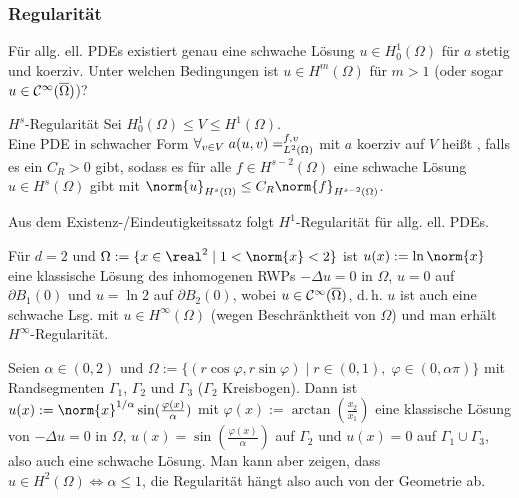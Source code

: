 \subsubsection{%
    Regularität%
}

\begin{Bem}
    Für allg. ell. PDEs existiert genau eine schwache Lösung $u \in H^1_0(\Omega)$ für
    $a$ stetig und koerziv.
    Unter welchen Bedingungen ist $u \in H^m(\Omega)$ für $m > 1$
    (oder sogar $u \in \mathcal{C}^\infty(\overline{\Omega})$)?
\end{Bem}

\begin{Def}{$H^s$-Regularität}
    Sei $H^1_0(\Omega) \le V \le H^1(\Omega)$.\\
    Eine PDE in schwacher Form $\forall_{v \in V}\; a(u, v) = \sp{f, v}_{L^2(\Omega)}$ mit
    $a$ koerziv auf $V$ heißt , falls es ein $C_R > 0$ gibt, sodass
    es für alle $f \in H^{s-2}(\Omega)$ eine schwache Lösung $u \in H^s(\Omega)$ gibt mit
    $\norm{u}_{H^s(\Omega)} \le C_R \norm{f}_{H^{s-2}(\Omega)}$.
\end{Def}

\begin{Bem}
    Aus dem Existenz-/Eindeutigkeitssatz folgt $H^1$-Regularität für allg. ell. PDEs.
\end{Bem}

\linie

\begin{Bsp}
    Für $d = 2$ und $\Omega := \{x \in \real^2 \;|\; 1 < \norm{x} < 2\}$
    ist $u(x) := \ln \norm{x}$ eine klassische Lösung des inhomogenen RWPs
    $-\Delta u = 0$ in $\Omega$,
    $u = 0$ auf $\partial B_1(0)$ und
    $u = \ln 2$ auf $\partial B_2(0)$, wobei $u \in \mathcal{C}^\infty(\overline{\Omega})$,
    d.\,h. $u$ ist auch eine schwache Lsg. mit $u \in H^\infty(\Omega)$
    (wegen Beschränktheit von $\Omega$)
    und man erhält $H^\infty$-Regularität.
\end{Bsp}

\begin{Bsp}
    Seien $\alpha \in (0, 2)$ und
    $\Omega := \{(r\cos\varphi, r\sin\varphi) \;|\; r \in (0, 1),\; \varphi \in (0, \alpha\pi)\}$
    mit Randsegmenten $\Gamma_1$, $\Gamma_2$ und $\Gamma_3$ ($\Gamma_2$ Kreisbogen).
    Dann ist $u(x) := \norm{x}^{1/\alpha} \sin(\frac{\varphi(x)}{\alpha})$ mit
    $\varphi(x) := \arctan(\frac{x_2}{x_1})$ eine klassische Lösung von
    $-\Delta u = 0$ in $\Omega$,
    $u(x) = \sin(\frac{\varphi(x)}{\alpha})$ auf $\Gamma_2$ und
    $u(x) = 0$ auf $\Gamma_1 \cup \Gamma_3$,
    also auch eine schwache Lösung.
    Man kann aber zeigen, dass $u \in H^2(\Omega) \iff \alpha \le 1$,
    die Regularität hängt also auch von der Geometrie ab.
\end{Bsp}

